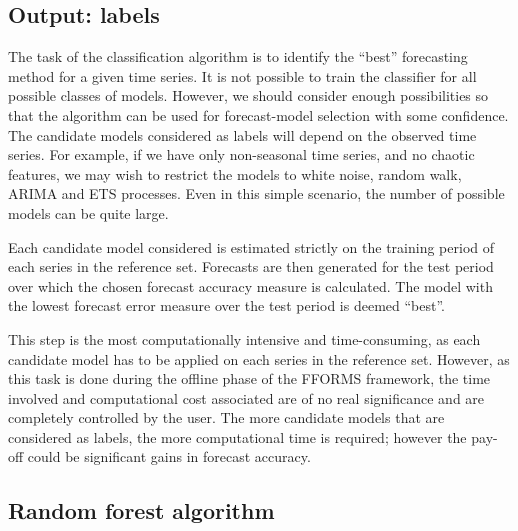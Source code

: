 \documentclass[11pt,a4paper,]{article}
\theoremstyle{definition}
\theoremstyle{definition}
\theoremstyle{definition}
\theoremstyle{remark}
\begin{document}
\hypertarget{output-labels}{%
\subsection{Output: labels}\label{output-labels}}

The task of the classification algorithm is to identify the ``best''
forecasting method for a given time series. It is not possible to train
the classifier for all possible classes of models. However, we should
consider enough possibilities so that the algorithm can be used for
forecast-model selection with some confidence. The candidate models
considered as labels will depend on the observed time series. For
example, if we have only non-seasonal time series, and no chaotic
features, we may wish to restrict the models to white noise, random
walk, ARIMA and ETS processes. Even in this simple scenario, the number
of possible models can be quite large.

Each candidate model considered is estimated strictly on the training
period of each series in the reference set. Forecasts are then generated
for the test period over which the chosen forecast accuracy measure is
calculated. The model with the lowest forecast error measure over the
test period is deemed ``best''.

This step is the most computationally intensive and time-consuming, as
each candidate model has to be applied on each series in the reference
set. However, as this task is done during the offline phase of the
FFORMS framework, the time involved and computational cost associated
are of no real significance and are completely controlled by the user.
The more candidate models that are considered as labels, the more
computational time is required; however the pay-off could be significant
gains in forecast accuracy.

\hypertarget{random-forest-algorithm}{%
\subsection{Random forest algorithm}\label{random-forest-algorithm}}
\end{document}
